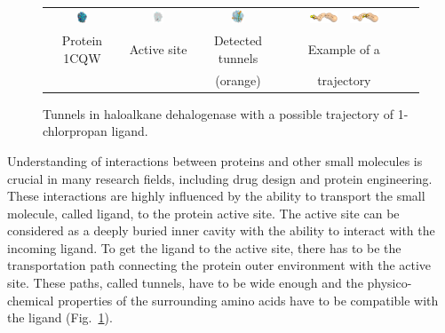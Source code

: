 \documentclass{svmult}
\begin{document}
\begin{figure}[b]
\centering
{\footnotesize
\renewcommand{\arraystretch}{0.1}
\renewcommand{\tabcolsep}{0pt}
\begin{tabular}{ccccc}
\includegraphics[width=0.15\textwidth]{fig/motiv1} &
\includegraphics[width=0.17\textwidth]{fig/motiv2lab} &
\includegraphics[width=0.16\textwidth]{fig/motiv3} &
\hbox{
\vbox{
\hbox{\includegraphics[width=0.25\textwidth]{fig/ta-1} }
\hbox{\includegraphics[width=0.25\textwidth]{fig/ta-433}}
} 
}
\\
Protein 1CQW & Active site & Detected tunnels & Example of a  \\
             &            & (orange)          & trajectory
\end{tabular}
}
\caption{\label{fig::motiv}
    Tunnels in haloalkane dehalogenase with a possible trajectory of 1-chlorpropan ligand.
}
\end{figure}

Understanding of interactions between proteins and other small molecules is crucial in many research fields, including drug design and protein engineering. 
These interactions are highly influenced by the ability to transport the small molecule, called ligand, to the protein active site.
The active site can be considered as a deeply buried inner cavity with the ability to interact with the incoming ligand.
To get the ligand to the active site, there has to be the transportation path connecting the protein outer environment with the active site.
These paths, called tunnels, have to be wide enough and the physico-chemical properties of the surrounding amino acids have to be compatible with the ligand (Fig.~\ref{fig::motiv}).
\end{document}
